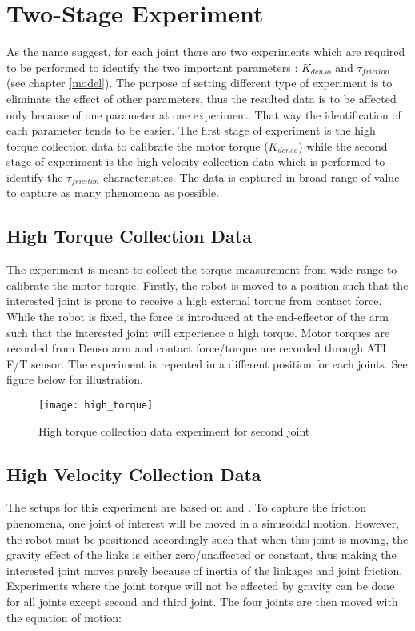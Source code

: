 \section{Two-Stage Experiment}
\label{two-stage experiment}
As the name suggest, for each joint there are two experiments which are required to be performed to identify the two important parameters : $K_{denso}$ and $\tau_{friction}$ (see chapter \ref{model}). The purpose of setting different type of experiment is to eliminate the effect of other parameters, thus the resulted data is to be affected only because of one parameter at one experiment. That way the identification of each parameter tends to be easier. The first stage of experiment is the high torque collection data to calibrate the motor torque ($K_{denso}$) while the second stage of experiment is the high velocity collection data which is performed to identify the $\tau_{friciton}$ characteristics. The data is captured in broad range of value to capture as many phenomena as possible.


\subsection{High Torque Collection Data}
\label{push exp}

The experiment is meant to collect the torque measurement from wide range to calibrate the motor torque. Firstly, the robot is moved to a position such that the interested joint is prone to receive a high external torque from contact force. While the robot is fixed, the force is introduced at the end-effector of the arm such that the interested joint will experience a high torque. Motor torques are recorded from Denso arm and contact force/torque are recorded through ATI F/T sensor. The experiment is repeated in a different position for each joints. See figure below for illustration.

\begin{figure}[H]
    \centering
    \texttt{[image: high\_torque]}
    \caption{High torque collection data experiment for second joint}
\end{figure}


\subsection{High Velocity Collection Data}
\label{fric exp}
The setups for this experiment are based on \cite{Nori15} and \cite{Ngoc09}. To capture the friction phenomena, one joint of interest will be moved in a sinusoidal motion. However, the robot must be positioned accordingly such that when this joint is moving, the gravity effect of the links is either zero/unaffected or constant, thus making the interested joint moves purely because of inertia of the linkages and joint friction. Experiments where the joint torque will not be affected by gravity can be done for all joints except second and third joint. The four joints are then moved with the equation of motion:

